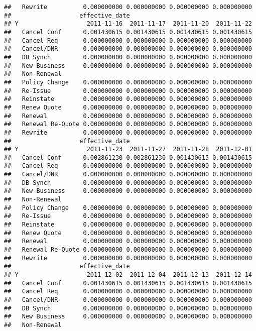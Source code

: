 \documentclass[]{article}
\begin{document}
\begin{verbatim}
##   Rewrite          0.000000000 0.000000000 0.000000000 0.000000000
##                   effective_date
## Y                   2011-11-16  2011-11-17  2011-11-20  2011-11-22
##   Cancel Conf      0.001430615 0.001430615 0.001430615 0.001430615
##   Cancel Req       0.000000000 0.000000000 0.000000000 0.000000000
##   Cancel/DNR       0.000000000 0.000000000 0.000000000 0.000000000
##   DB Synch         0.000000000 0.000000000 0.000000000 0.000000000
##   New Business     0.000000000 0.000000000 0.000000000 0.000000000
##   Non-Renewal                                                     
##   Policy Change    0.000000000 0.000000000 0.000000000 0.000000000
##   Re-Issue         0.000000000 0.000000000 0.000000000 0.000000000
##   Reinstate        0.000000000 0.000000000 0.000000000 0.000000000
##   Renew Quote      0.000000000 0.000000000 0.000000000 0.000000000
##   Renewal          0.000000000 0.000000000 0.000000000 0.000000000
##   Renewal Re-Quote 0.000000000 0.000000000 0.000000000 0.000000000
##   Rewrite          0.000000000 0.000000000 0.000000000 0.000000000
##                   effective_date
## Y                   2011-11-23  2011-11-27  2011-11-28  2011-12-01
##   Cancel Conf      0.002861230 0.002861230 0.001430615 0.001430615
##   Cancel Req       0.000000000 0.000000000 0.000000000 0.000000000
##   Cancel/DNR       0.000000000 0.000000000 0.000000000 0.000000000
##   DB Synch         0.000000000 0.000000000 0.000000000 0.000000000
##   New Business     0.000000000 0.000000000 0.000000000 0.000000000
##   Non-Renewal                                                     
##   Policy Change    0.000000000 0.000000000 0.000000000 0.000000000
##   Re-Issue         0.000000000 0.000000000 0.000000000 0.000000000
##   Reinstate        0.000000000 0.000000000 0.000000000 0.000000000
##   Renew Quote      0.000000000 0.000000000 0.000000000 0.000000000
##   Renewal          0.000000000 0.000000000 0.000000000 0.000000000
##   Renewal Re-Quote 0.000000000 0.000000000 0.000000000 0.000000000
##   Rewrite          0.000000000 0.000000000 0.000000000 0.000000000
##                   effective_date
## Y                   2011-12-02  2011-12-04  2011-12-13  2011-12-14
##   Cancel Conf      0.001430615 0.001430615 0.001430615 0.001430615
##   Cancel Req       0.000000000 0.000000000 0.000000000 0.000000000
##   Cancel/DNR       0.000000000 0.000000000 0.000000000 0.000000000
##   DB Synch         0.000000000 0.000000000 0.000000000 0.000000000
##   New Business     0.000000000 0.000000000 0.000000000 0.000000000
##   Non-Renewal                                                     

\end{verbatim}
\end{document}
